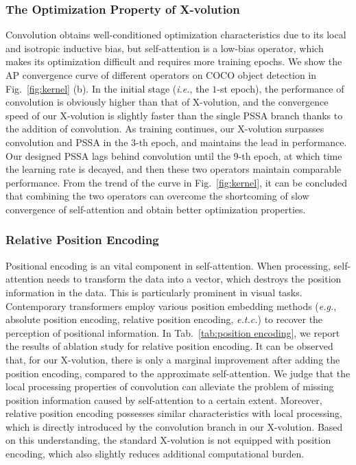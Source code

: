 \documentclass{article}
\begin{document}
\subsubsection{The Optimization Property of X-volution}\label{sec_optimization}
Convolution obtains well-conditioned optimization characteristics due to its local and isotropic inductive bias, but self-attention is a low-bias operator, which makes its optimization difficult and requires more training epochs.
We show the AP convergence curve of different operators on COCO object detection in Fig.~\ref{fig:kernel} (b). In the initial stage (\emph{i.e.}, the $1$-st epoch), the performance of convolution is obviously higher than that of X-volution, and the convergence speed of our X-volution is slightly faster than the single PSSA branch thanks to the addition of convolution.
As training continues, our X-volution surpasses convolution and PSSA in the $3$-th epoch, and maintains the lead in performance.
Our designed PSSA lags behind convolution until the $9$-th epoch, at which time the learning rate is decayed, and then these two operators maintain comparable performance.
From the trend of the curve in Fig.~\ref{fig:kernel}, it can be concluded that combining the two operators can overcome the shortcoming of slow convergence of self-attention and obtain better optimization properties.


\vspace{2mm}
\subsubsection{Relative Position Encoding}
Positional encoding\cite{DBLP:conf/nips/VaswaniSPUJGKP17, DBLP:conf/naacl/ShawUV18} is an vital component in self-attention.
When processing, self-attention needs to transform the data into a vector, which destroys the position information in the data.
This is particularly prominent in visual tasks.
Contemporary transformers\cite{DBLP:journals/corr/abs-2103-14030, DBLP:journals/corr/abs-2101-11605, DBLP:conf/eccv/CarionMSUKZ20} employ various position embedding methods (\emph{e.g.}, absolute position encoding, relative position encoding, \emph{e.t.c.}) to recover the perception of positional information.
In Tab.~\ref{tab:position encoding}, we report the results of ablation study for relative position encoding.
It can be observed that, for our X-volution, there is only a marginal improvement after adding the position encoding, compared to the approximate self-attention.
We judge that the local processing properties of convolution can alleviate the problem of missing position information caused by self-attention to a certain extent.
Moreover, relative position encoding possesses similar characteristics with local processing, which is directly introduced by the convolution branch in our X-volution.
Based on this understanding, the standard X-volution is not equipped with position encoding, which also slightly reduces additional computational burden.
\end{document}
